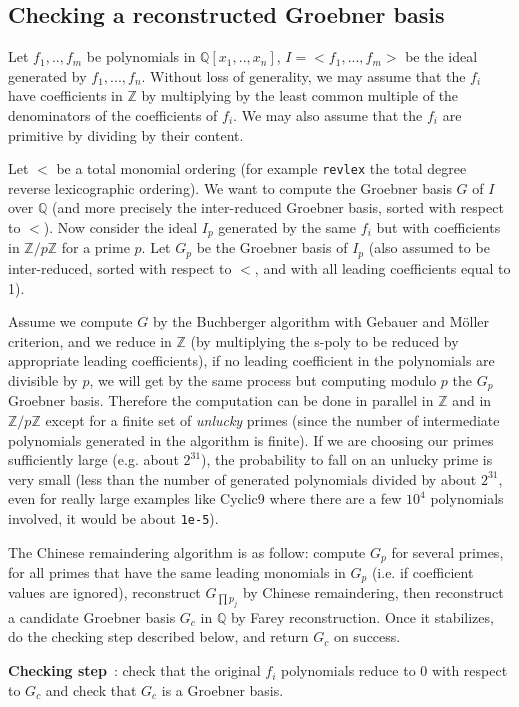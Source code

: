 \documentclass[a4paper,11pt]{article}
\newcommand{\Z}{{\mathbb{Z}}}
\newcommand{\Q}{{\mathbb{Q}}}
\begin{document}
\subsection{Checking a reconstructed Groebner basis} \label{sec:probagb}
Let $f_1,..,f_m$ be polynomials in $\Q[x_1,..,x_n]$, $I=<f_1,...,f_m>$
be the ideal generated by $f_1,...,f_n$. Without loss of generality, we may
assume that the $f_i$ have coefficients in $\Z$ by multiplying
by the least common multiple of the denominators of the coefficients
of $f_i$. We may also assume that the $f_i$ are primitive by dividing
by their content.

Let $<$ be a total monomial ordering (for example {\tt revlex} the
total degree reverse lexicographic ordering). We want to compute
the Groebner basis $G$ of $I$ over $\Q$ (and more precisely
the inter-reduced Groebner basis, sorted with respect to $<$).
Now consider the ideal $I_p$ generated by the same $f_i$ but with
coefficients in $\Z/p\Z$ for a prime $p$. Let $G_p$ be the Groebner basis of $I_p$
(also assumed to be inter-reduced, sorted with respect to $<$, and with
all leading coefficients equal to 1).

Assume we compute $G$ by the Buchberger
algorithm with Gebauer and M\"oller criterion, and we reduce in $\Z$
(by multiplying the s-poly to be reduced by appropriate leading
coefficients), if no leading coefficient in the polynomials are
divisible by $p$, we will get by the same process but computing modulo
$p$ the $G_p$ Groebner basis. Therefore the computation can be
done in parallel in $\Z$ and in $\Z/p\Z$ except for a finite 
set of {\em unlucky} primes (since the number of intermediate polynomials
generated in the algorithm is finite). If we are choosing our primes
sufficiently large (e.g. about $2^{31}$), the probability to fall on
an unlucky prime is very small (less than the number of generated
polynomials divided by about $2^{31}$, even for really large 
examples like Cyclic9 where there are a few $10^4$ polynomials 
involved, it would be about {\tt 1e-5}).

The Chinese remaindering algorithm is as follow: compute $G_p$ for
several primes, for all primes that have the same leading monomials
in $G_p$ (i.e. if coefficient values are ignored), reconstruct
$G_{\prod p_j}$ by Chinese remaindering, then reconstruct a
candidate Groebner basis $G_c$ in $\Q$ by Farey reconstruction. Once it
stabilizes, do the checking step described below, and return $G_c$
on success.

{\bf Checking step}~: check that the original $f_i$ polynomials reduce
to 0 with respect to $G_c$ and check that $G_c$ is a Groebner basis.
\end{document}
